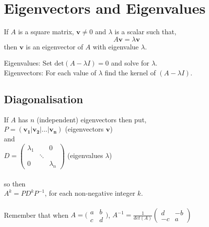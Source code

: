 \documentclass[a4paper,10pt]{article}
\begin{document}
\section*{Eigenvectors and Eigenvalues}
If $A$ is a square matrix, $\mathbf{v} \ne 0$ and $\lambda$ is a scalar such that,
$$A\mathbf{v} = \lambda\mathbf{v}$$
then $\mathbf{v}$ is an eigenvector of $A$ with eigenvalue $\lambda$.\\
\begin{comment}
\begin{equation*}
A\mathbf{v} = \lambda\mathbf{v}
\implies (A-\lambda I)\mathbf{v} = \mathbf{0} 

A-\lambda I \mbox{has no inverse (otherwise } \mathbf{v} = \mathbf{0} \mbox{)}
\mbox{so set det}(A-\lambda I) = 0
 \mbox{this finds the eigenvectors}

\mbox{Also since}
(A-\lambda I)\mathbf{v} = \mathbf{0} 
\mathbf{v} \in \mbox{ker}(A-\lambda I)
\mbox{this gives eigenvectors.}
\end{equation*}
\end{comment}
Eigenvalues: Set $\mbox{det}(A-\lambda I) = 0$ and solve for $\lambda.$\\
Eigenvectors: For each value of $\lambda$ find the kernel of $(A-\lambda I)$.

\subsection*{Diagonalisation}
If $A$ has $n$ (independent) eigenvectors then put,\\
$P = (\mathbf{v_1}|\mathbf{v_2}|...|\mathbf{v_n})$ (eigenvectors $\mathbf{v}$)\\
and\\
$D = 
\begin{pmatrix}
  \lambda_1 &        & 0         \\
            & \ddots &           \\ 
  0         &        & \lambda_n
\end{pmatrix}
$ (eigenvalues $\lambda$)\\
\\
so then\\
$A^k = PD^kP^{-1}$, for each non-negative integer $k$.\\
\\
Remember that when $A = 
\bigl( \begin{smallmatrix}
  a&b\\ c&d
\end{smallmatrix} \bigr)$, $A^{-1} = \frac{1}{det(A)}
\begin{pmatrix}
d & -b\\
-c & a\end{pmatrix}$
\end{document}
